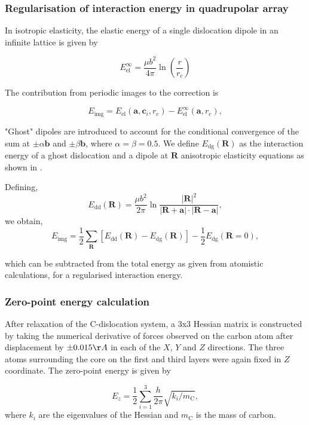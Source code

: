 \documentclass[a4paper,11pt]{article}
\numberwithin{equation}{chapter}
\numberwithin{listing}{chapter}
\begin{document}
\subsubsection{Regularisation of interaction energy in quadrupolar array}
\label{sec:org1e7b00d}
\label{sec:Ainteractionenergy}


In isotropic elasticity, the elastic energy of a single dislocation dipole in an
infinite lattice is given by


\[ E_{\text{el}}^{\infty} = \frac{\mu b^2}{4\pi} \ln \left( \frac{r}{r_{c}} \right)  \]

The contribution from periodic images to the correction is

\[ E_{\text{img} } = E_{\text{el}} (\mathbf{a}, \mathbf{c}_i , r_c) - E_{\text{el}}^{\infty}
   (\mathbf{a}, r_c),\]

"Ghost" dipoles are introduced to account for the conditional convergence of the sum at \(\pm\alpha
   \mathbf{b}\) and \(\pm \beta\mathbf{b}\), where \(\alpha = \beta = 0.5\). We define \(E_{\text{dg}} (\mathbf{R})\) as the
interaction energy of a ghost dislocation and a dipole at \(\mathbf{R}\) anisotropic elasticity
equations as shown in \cite{Cai2003}.


Defining,
 \[ E_{\text{dd}} (\mathbf{R}) = \frac{\mu b^2}{2\pi}
   \ln \frac{|\mathbf{R}|^2}{|\mathbf{R}+\mathbf{a}|\cdot|\mathbf{R}-\mathbf{a}|},
   \]
we obtain,
\[ E_{\text{img}} = \frac{1}{2}\sum_{\mathbf{R}} [ E_{\text{dd}} (\mathbf{R}) - E_{\text{dg}} (\mathbf{R}) ] - \frac{1}{2}
   E_{\text{dg}} (\mathbf{R} = 0),  \]

which can be subtracted from the total energy as given from atomistic calculations, for a
regularised interaction energy.


\subsubsection{Zero-point energy calculation}
\label{sec:orgc3a426d}
\label{sec:zeropointenergy}

After relaxation of the C-dislocation system, a 3x3 Hessian matrix is constructed by taking the
numerical derivative of forces observed on the carbon atom after displacement by \(\pm 0.015 \AA\) in
each of the \(X\), \(Y\) and \(Z\) directions.  The three atoms surrounding the core on the first and
third layers were again fixed in \(Z\) coordinate. The zero-point energy is given by

\[ E_z = \frac{1}{2} \sum_{i=1}^3 \frac{h}{2\pi} \sqrt{ k_i /
   m_{\text{C}} },  \]
where \(k_i\) are the eigenvalues of the Hessian and \(m_\text{C}\) is
the mass of carbon.
\end{document}
